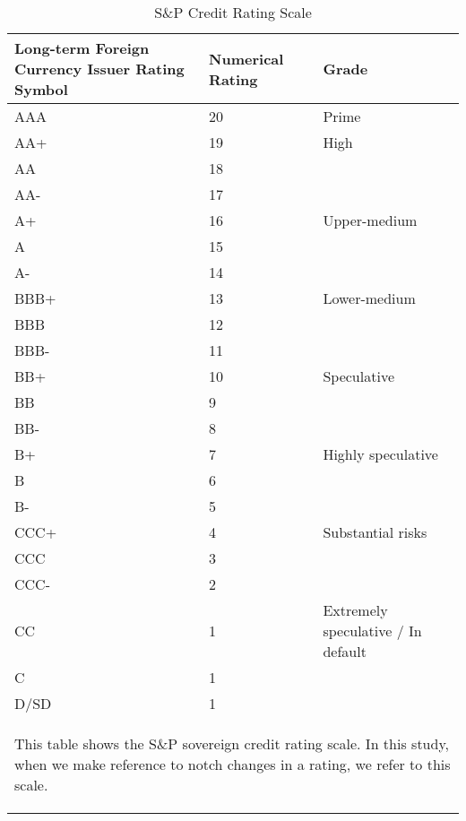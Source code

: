 
\begin{table}[tb!]
\footnotesize
\centering
\caption{S\&P Credit Rating Scale}
\label{tab:sp_rating_scale}
\begin{tabularx}{\textwidth}{p{4cm} p{3cm} p{4cm} }
\hline
Long-term Foreign Currency Issuer Rating Symbol & Numerical Rating & Grade \\
\hline
AAA & 20 & Prime \\
AA+ & 19 & High \\
AA & 18 & \\
AA- & 17 & \\
A+ & 16 & Upper-medium \\
A & 15 & \\
A- & 14 & \\
BBB+ & 13 & Lower-medium \\
BBB & 12 & \\
BBB- & 11 & \\
BB+ & 10 & Speculative \\
BB & 9 & \\
BB- & 8 & \\
B+ & 7 & Highly speculative \\
B & 6 & \\
B- & 5 & \\
CCC+ & 4 & Substantial risks \\
CCC & 3 & \\
CCC- & 2 & \\
CC & 1 & Extremely speculative / In default \\
C & 1 & \\
D/SD & 1 & \\
\hline
\multicolumn{3}{p{\textwidth}}{\begin{footnotesize}This table shows the S\&P sovereign credit rating scale. In this study, when we make reference to notch changes in a rating, we refer to this scale.
\end{footnotesize}
}
\end{tabularx}
\end{table}
